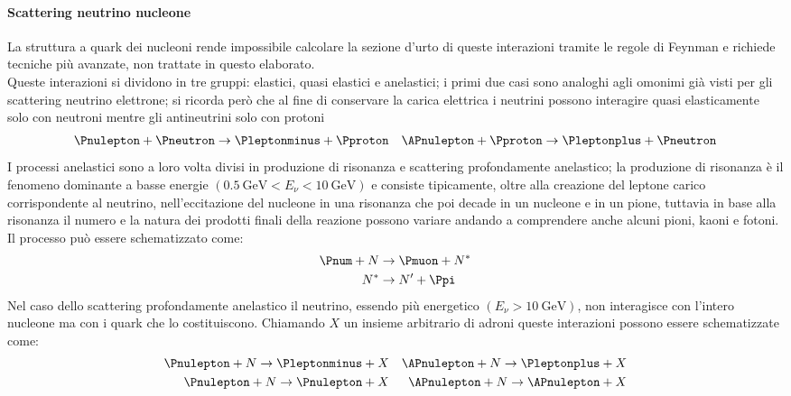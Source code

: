 \documentclass[../../main.tex]{subfiles}
\begin{document}
  \paragraph{Scattering neutrino nucleone}
    La struttura a quark dei nucleoni rende impossibile calcolare la sezione
    d'urto di queste interazioni tramite le regole di Feynman e richiede
    tecniche più avanzate, non trattate in questo elaborato.\\
    Queste interazioni si dividono in tre gruppi: elastici, quasi elastici e
    anelastici; i primi due casi sono analoghi agli omonimi già visti per gli
    scattering neutrino elettrone; si ricorda però che al fine di conservare la
    carica elettrica i neutrini possono interagire quasi elasticamente solo con
    neutroni mentre gli antineutrini solo con protoni
    \begin{align*}
      \Pnulepton + \Pneutron \rightarrow \Pleptonminus + \Pproton &&
      \APnulepton + \Pproton \rightarrow \Pleptonplus + \Pneutron
    \end{align*}
    I processi anelastici sono a loro volta divisi in produzione di risonanza e
    scattering profondamente anelastico; la produzione di risonanza è il
    fenomeno dominante a basse energie
    $\left(0.5\: \text{GeV} < E_\nu < 10\: \text{GeV} \right)$
    e consiste tipicamente, oltre alla creazione del leptone
    carico corrispondente al neutrino, nell'eccitazione del nucleone in una
    risonanza che poi decade in un nucleone e in un pione, tuttavia in base alla
    risonanza il numero e la natura dei prodotti finali della reazione possono
    variare andando a comprendere anche alcuni pioni, kaoni e fotoni.
    Il processo può essere schematizzato come:
    \begin{align*}
      \Pnum + N &\rightarrow \Pmuon + N^* \\
      N^* &\rightarrow N' + \Ppi
    \end{align*}
    Nel caso dello scattering profondamente anelastico il neutrino, essendo
    più energetico $\left( E_{\nu} > 10 \: \text{GeV} \right)$, non interagisce
    con l'intero nucleone ma con i quark che lo costituiscono.
    Chiamando $X$ un insieme arbitrario di adroni queste interazioni possono
    essere schematizzate come:
    \begin{align*}
      \Pnulepton + N \rightarrow \Pleptonminus + X &&
      \APnulepton + N \rightarrow \Pleptonplus + X \\
      \Pnulepton + N \rightarrow \Pnulepton + X &&
      \APnulepton + N \rightarrow \APnulepton + X
    \end{align*}
\end{document}
